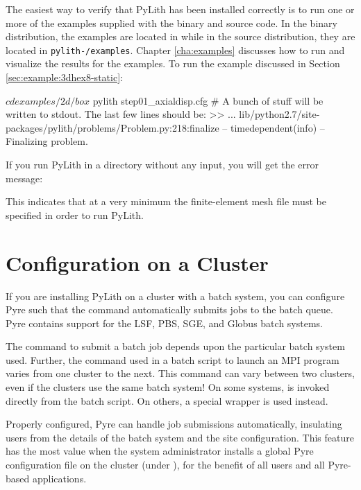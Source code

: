 The easiest way to verify that PyLith has been installed correctly is
to run one or more of the examples supplied with the binary and source
code. In the binary distribution, the examples are located in
 while in the source distribution,
they are located in \texttt{pylith-\pylithVersionNumber/examples}. Chapter
\vref{cha:examples} discusses how to run and visualize the results
for the examples. To run the example discussed in Section
\vref{sec:example:3dhex8-static}:
\begin{shell}
$ cd examples/2d/box
$ pylith step01_axialdisp.cfg
# A bunch of stuff will be written to stdout. The last few lines should be:
 >> ... lib/python2.7/site-packages/pylith/problems/Problem.py:218:finalize
 -- timedependent(info)
 -- Finalizing problem.
\end{shell}
If you run PyLith in a directory without any input, you will get the
error message:
This indicates that at a very minimum the finite-element mesh file
must be specified in order to run PyLith.


\section{Configuration on a Cluster}

If you are installing PyLith on a cluster with a batch system, you can
configure Pyre such that the  command automatically
submits jobs to the batch queue. Pyre contains support for the LSF,
PBS, SGE, and Globus batch systems.

The command to submit a batch job depends upon the particular batch
system used. Further, the command used in a batch script to launch an
MPI program varies from one cluster to the next. This command can vary
between two clusters, even if the clusters use the same batch system!
On some systems,  is invoked directly from the batch
script. On others, a special wrapper is used instead.

Properly configured, Pyre can handle job submissions automatically,
insulating users from the details of the batch system and the site
configuration. This feature has the most value when the system
administrator installs a global Pyre configuration file on the cluster
(under ), for the benefit of all users and
all Pyre-based applications.


